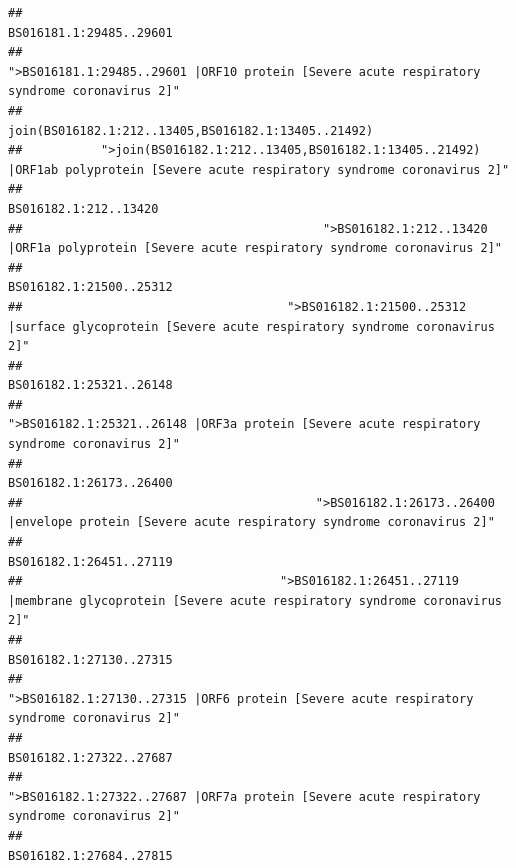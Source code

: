 \documentclass[
]{article}
\begin{document}
\begin{verbatim}
##                                                                                                                BS016181.1:29485..29601 
##                                            ">BS016181.1:29485..29601 |ORF10 protein [Severe acute respiratory syndrome coronavirus 2]" 
##                                                                                    join(BS016182.1:212..13405,BS016182.1:13405..21492) 
##           ">join(BS016182.1:212..13405,BS016182.1:13405..21492) |ORF1ab polyprotein [Severe acute respiratory syndrome coronavirus 2]" 
##                                                                                                                  BS016182.1:212..13420 
##                                          ">BS016182.1:212..13420 |ORF1a polyprotein [Severe acute respiratory syndrome coronavirus 2]" 
##                                                                                                                BS016182.1:21500..25312 
##                                     ">BS016182.1:21500..25312 |surface glycoprotein [Severe acute respiratory syndrome coronavirus 2]" 
##                                                                                                                BS016182.1:25321..26148 
##                                            ">BS016182.1:25321..26148 |ORF3a protein [Severe acute respiratory syndrome coronavirus 2]" 
##                                                                                                                BS016182.1:26173..26400 
##                                         ">BS016182.1:26173..26400 |envelope protein [Severe acute respiratory syndrome coronavirus 2]" 
##                                                                                                                BS016182.1:26451..27119 
##                                    ">BS016182.1:26451..27119 |membrane glycoprotein [Severe acute respiratory syndrome coronavirus 2]" 
##                                                                                                                BS016182.1:27130..27315 
##                                             ">BS016182.1:27130..27315 |ORF6 protein [Severe acute respiratory syndrome coronavirus 2]" 
##                                                                                                                BS016182.1:27322..27687 
##                                            ">BS016182.1:27322..27687 |ORF7a protein [Severe acute respiratory syndrome coronavirus 2]" 
##                                                                                                                BS016182.1:27684..27815 

\end{verbatim}
\end{document}
